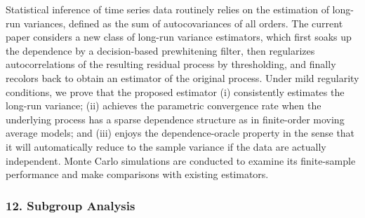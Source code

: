 \begin{itemize}
Statistical inference of time series data routinely relies on the estimation of long-run variances, defined as the sum of autocovariances of all orders. The current paper considers a new class of long-run variance estimators, which first soaks up the dependence by a decision-based prewhitening filter, then regularizes autocorrelations of the resulting residual process by thresholding, and finally recolors back to obtain an estimator of the original process. Under mild regularity conditions, we prove that the proposed estimator (i) consistently estimates the long-run variance; (ii) achieves the parametric convergence rate when the underlying process has a sparse dependence structure as in finite-order moving average models; and (iii) enjoys the dependence-oracle property in the sense that it will automatically reduce to the sample variance if the data are actually independent. Monte Carlo simulations are conducted to examine its finite-sample performance and make comparisons with existing estimators.

\end{itemize}

\subsubsection*{12. Subgroup Analysis}

